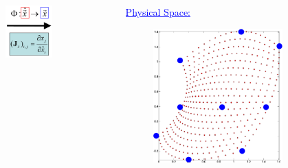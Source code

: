 \documentclass[8pt,xcolor=svgnames]{beamer}
\begin{document}
\begin{frame}[shrink=5]
\begin{columns}
\begin{column}{0.3\textwidth}
  \end{column}
  \begin{column}{0.3\textwidth}
   \begin{figure}[h!]
    \centering
    \includegraphics[width=0.6\textwidth,keepaspectratio=true]{./Images/transSpace.png}
    \end{figure}
  \end{column}
  \begin{column}{0.3\textwidth}
  \centering
  \textcolor{blue}{\underline{Physical Space:}}
   \begin{figure}[h!]
    \centering
    \includegraphics[width=1.0\textwidth,keepaspectratio=true]{./Images/physSpace.png}

\end{figure}
\end{column}
\end{columns}
\end{frame}
\end{document}
